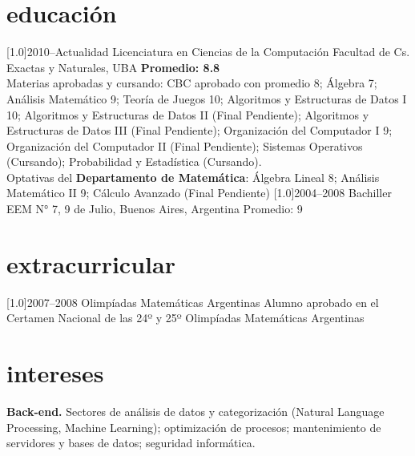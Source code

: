 \documentclass[espanol]{cv-style}     %
\begin{document}
\section{educación}
  \vspace{-0.2cm}
\begin{entrylist}
\entry
{\scalebox{.8}[1.0]{2010--Actualidad}}
{Licenciatura en Ciencias de la Computación}
{Facultad de Cs. Exactas y Naturales, UBA}
{\textbf{Promedio: 8.8}\\
\small{Materias aprobadas y cursando: CBC aprobado con promedio 8; Álgebra 7; Análisis Matemático 9; Teoría de Juegos 10; Algoritmos y Estructuras de Datos I 10; Algoritmos y Estructuras de Datos II (Final Pendiente); Algoritmos y Estructuras de Datos III (Final Pendiente); Organización del Computador I 9; Organización del Computador II (Final Pendiente); Sistemas Operativos (Cursando); Probabilidad y Estadística (Cursando).\\
Optativas del \textbf{Departamento de Matemática}: Álgebra Lineal 8; Análisis Matemático II 9; Cálculo Avanzado (Final Pendiente)}}
\entry
{\scalebox{.8}[1.0]{2004--2008}}
{Bachiller }
{EEM N° 7, 9 de Julio, Buenos Aires, Argentina}
{Promedio: 9}
\end{entrylist}
\section{extracurricular}
  \vspace{-0.2cm}
\begin{entrylist}
\entry
{\scalebox{.8}[1.0]{2007--2008}}
{Olimpíadas Matemáticas Argentinas}
{}
{Alumno aprobado en el Certamen Nacional de las 24º y 25º Olimpíadas Matemáticas Argentinas}
\end{entrylist}
  \vspace{-0.2cm}
\section{intereses}
  \vspace{-0.2cm}
\textbf{Back-end.} Sectores de análisis de datos y categorización (Natural Language Processing, Machine Learning); optimización de procesos; mantenimiento de servidores y bases de datos; seguridad informática.
\end{document}
